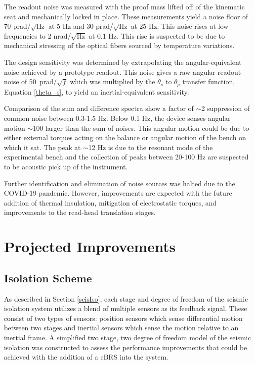 \documentclass [12pt, proquest]{uwthesis}[2019]
\begin{document}
The readout noise was measured with the proof mass lifted off of the kinematic seat and mechanically locked in place. These measurements yield a noise floor of 70 prad/$\sqrt{\text{Hz}}$ at 5 Hz and 30 prad/$\sqrt{\text{Hz}}$ at 25 Hz. This noise rises at low frequencies to 2 nrad/$\sqrt{\text{Hz}}$ at 0.1 Hz. This rise is suspected to be due to mechanical stressing of the optical fibers sourced by temperature variations.

 The design sensitivity was determined by extrapolating the angular-equivalent noise achieved by a prototype readout. This noise gives a raw angular readout noise of 50~prad/$\sqrt{f}$ which was multiplied by the $\tilde{\theta}_{s}$ to $\tilde{\theta}_{p}$ transfer function, Equation \ref{theta_s}, to yield an inertial-equivalent sensitivity.
 
 Comparison of the sum and difference spectra show a factor of $\sim$2 suppression of common noise between 0.3-1.5 Hz. Below 0.1 Hz, the device senses angular motion $\sim$100 larger than the sum of noises. This angular motion could be due to either external torques acting on the balance or angular motion of the bench on which it sat. The peak at $\sim$12 Hz is due to the resonant mode of the experimental bench and the collection of peaks between 20-100 Hz are suspected to be acoustic pick up of the instrument. 
 
 Further identification and elimination of noise sources was halted due to the COVID-19 pandemic. However, improvements are expected with the future addition of thermal insulation, mitigation of electrostatic torques, and improvements to the read-head translation stages.


\section{Projected Improvements}
\subsection{Isolation Scheme} \label{IsoScheme}

As described in Section \ref{seisIso}, each stage and degree of freedom of the seismic isolation system utilizes a blend of multiple sensors as its feedback signal. These consist of two types of sensors: position sensors which sense differential motion between two stages and inertial sensors which sense the motion relative to an inertial frame. A simplified two stage, two degree of freedom model of the seismic isolation was constructed to assess the performance improvements that could be achieved with the addition of a cBRS into the system. 
\end{document}
